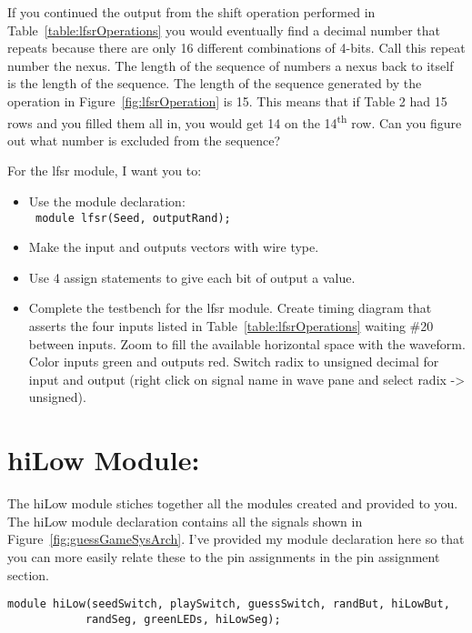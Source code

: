 If you continued the output from the shift operation performed in Table~\ref{table:lfsrOperations} 
you would eventually find a decimal number that repeats because there
are only 16 different combinations of 4-bits. Call this repeat number
the nexus. The length of the sequence of numbers a nexus back to itself
is the length of the sequence. The length of the sequence generated by
the operation in Figure~\ref{fig:lfsrOperation} is 15. This means that if Table 2 had 15 rows
and you filled them all in, you would get 14 on the
14\textsuperscript{th} row. Can you figure out what number is excluded
from the sequence?

For the lfsr module, I want you to:

\begin{itemize}
\item
  Use the module declaration:\\
\verb+ module lfsr(Seed, outputRand);+

\item
  Make the input and outputs vectors with wire type.
\item
  \protect\hypertarget{lfsr_verilog}{}{}Use 4 assign statements to give
  each bit of output a value.
\item
  \protect\hypertarget{lfsr_testbench}{}{}Complete the testbench for the
  lfsr module. Create timing diagram that asserts the four inputs listed
  in Table~\ref{table:lfsrOperations} 
  waiting \#20 between inputs. Zoom to fill the available
  horizontal space with the waveform. Color inputs green and outputs
  red. Switch radix to unsigned decimal for input and output (right
  click on signal name in wave pane and select radix -\textgreater{}
  unsigned).
\end{itemize}

\hypertarget{hilow-module}{%
\section{hiLow Module:}\label{hilow-module}}

The hiLow module stiches together all the modules created and provided
to you. The hiLow module declaration contains all the signals shown in
Figure~\ref{fig:guessGameSysArch}. I've provided my module declaration here so that you can more
easily relate these to the pin assignments in the pin assignment
section.

\begin{verbatim}
module hiLow(seedSwitch, playSwitch, guessSwitch, randBut, hiLowBut,
			randSeg, greenLEDs, hiLowSeg);
\end{verbatim}

